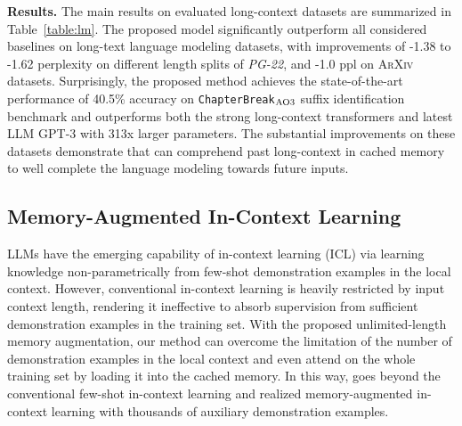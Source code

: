 \textbf{Results.} The main results on evaluated long-context datasets are summarized in Table~\ref{table:lm}. The proposed \our{} model significantly outperform all considered baselines on long-text language modeling datasets, with improvements of -1.38 to -1.62 perplexity on different length splits of \textit{PG-22}, and -1.0 ppl on \textsc{ArXiv} datasets. Surprisingly, the proposed method achieves the state-of-the-art performance of 40.5\% accuracy on \texttt{ChapterBreak}$_\textnormal{AO3}$ suffix identification benchmark and outperforms both the strong long-context transformers and latest LLM GPT-3 with 313x larger parameters. The substantial improvements on these datasets demonstrate that \our{} can comprehend past long-context in cached memory to well complete the language modeling towards future inputs. 

\subsection{Memory-Augmented In-Context Learning}
\label{ssec:incontext}

LLMs have the emerging capability of in-context learning (ICL) via learning knowledge non-parametrically from few-shot demonstration examples in the local context. However, conventional in-context learning is heavily restricted by input context length, rendering it ineffective to absorb supervision from sufficient demonstration examples in the training set. With the proposed unlimited-length memory augmentation, our \our{} method can overcome the limitation of the number of demonstration examples in the local context and even attend on the whole training set by loading it into the cached memory. In this way, \our{} goes beyond the conventional few-shot in-context learning and realized memory-augmented in-context learning with thousands of auxiliary demonstration examples.

